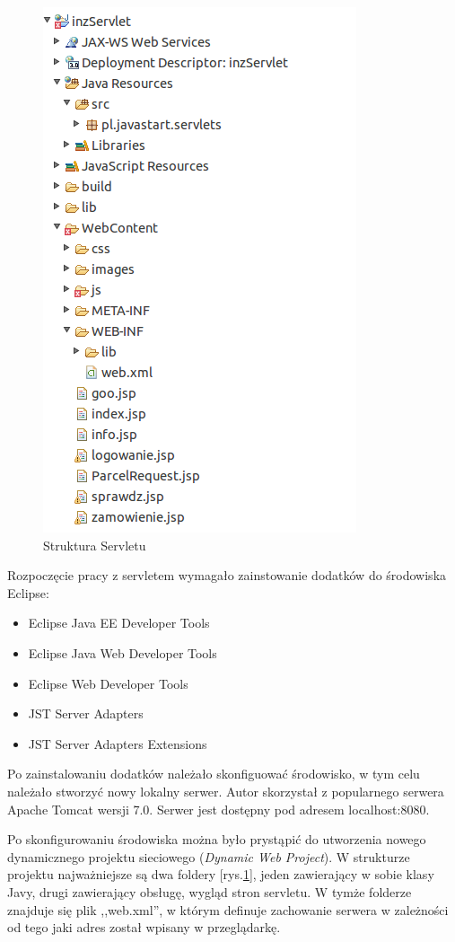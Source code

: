 \documentclass[eng,printmode,oneside]{mgr}
\begin{document}
\begin{figure}
\centering
\captionsetup{justification=centering,margin=0cm}
\vspace{-10pt}
\begin{center}
\includegraphics[width=.3\textwidth]{strukturaServlet.png}
\end{center}
\vspace{-10pt}
  \caption{Struktura Servletu}
\label{servlet}
\vspace{-60pt}
\end{figure}

Rozpoczęcie pracy z servletem wymagało zainstowanie dodatków do środowiska
Eclipse:
\begin{itemize}
  \item Eclipse Java EE Developer Tools
  \item Eclipse Java Web Developer Tools
  \item Eclipse Web Developer Tools
  \item JST Server Adapters
  \item JST Server Adapters Extensions
\end{itemize}
Po zainstalowaniu dodatków należało skonfiguować środowisko, w tym celu należało
stworzyć nowy lokalny serwer. Autor skorzystał z popularnego serwera Apache
Tomcat wersji 7.0. Serwer jest dostępny pod adresem localhost:8080. 

Po skonfigurowaniu środowiska można było prystąpić do utworzenia nowego
dynamicznego projektu sieciowego (\textsl{Dynamic Web Project}). W strukturze
projektu najważniejsze są dwa foldery [rys.\ref{servlet}], jeden zawierający w
sobie klasy Javy, drugi zawierający obsługę, wygląd stron servletu. W tymże
folderze znajduje się plik ,,web.xml'', w którym definuje zachowanie serwera w
zależności od tego jaki adres został wpisany w przeglądarkę. 
\end{document}

